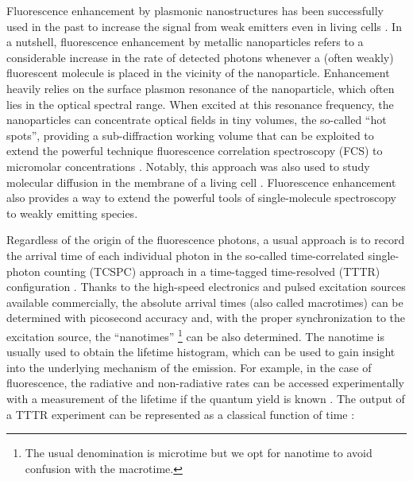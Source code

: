 Fluorescence enhancement by plasmonic nanostructures has been successfully 
used in the past to increase the signal from weak 
emitters \cite{kinkhabwala2009large, yuan2013thousandfold, khatua2014resonant} even in 
living cells \cite{vanzanten2010imaging}. In a nutshell, fluorescence enhancement
by metallic nanoparticles refers to a considerable increase in the rate of detected 
photons whenever a (often weakly) fluorescent molecule is placed in the vicinity of the nanoparticle.
Enhancement heavily relies on the surface plasmon resonance of the nanoparticle, which often lies
in the optical spectral range. When excited at this resonance frequency, 
the nanoparticles can concentrate optical fields in tiny volumes,
the so-called ``hot spots'', providing a sub-diffraction 
working volume that can be exploited to extend the powerful technique fluorescence 
correlation spectroscopy (FCS) to micromolar 
concentrations \cite{estrada200810000,manzo2011nanoscale,kinkhabwala2012fluorescence,punj2013gold,khatua2014enhancedfluorescence}. 
Notably, this approach was also used to study molecular diffusion in the membrane 
of a living cell \cite{flauraud2015largescale}.
Fluorescence enhancement also provides a way to extend the powerful tools of single-molecule spectroscopy to 
weakly emitting species.


Regardless of the origin of the fluorescence photons, a usual approach is to record the arrival time of each individual 
photon in the so-called time-correlated single-photon counting (TCSPC) approach in a time-tagged 
time-resolved (TTTR) configuration  \cite{Wahl_picoquant,becker2015advanced}. 
Thanks to the high-speed electronics and pulsed excitation sources available commercially, 
the absolute arrival times (also called macrotimes) can be determined with picosecond accuracy and, with the proper synchronization to the excitation source, the ``nanotimes'' \footnote{The usual denomination is microtime but we opt for nanotime to avoid confusion with the macrotime.} can be also determined. 
The nanotime is usually used to obtain the lifetime histogram, which can be used to 
gain insight into the underlying mechanism of the emission. For example, 
in the case of fluorescence, the radiative and non-radiative rates can be accessed experimentally with a 
measurement of the lifetime if the quantum yield is known \cite{lakowicz2007principles}.
The output of a TTTR experiment can be represented as a classical function of time \cite{Lippitz2005}:

